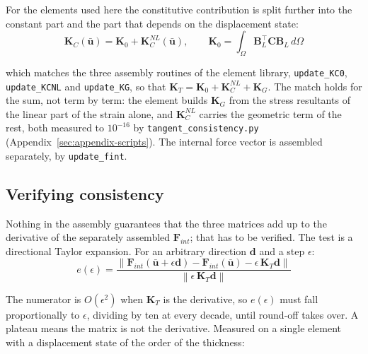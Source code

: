 \documentclass[11pt,a4paper]{article}
\begin{document}
For the elements used here the constitutive contribution is split further into
the constant part and the part that depends on the displacement state:
\begin{equation}\label{eq:KC-split}
	\boldsymbol{K}_C(\boldsymbol{\bar{u}})
	= \boldsymbol{K}_0 + \boldsymbol{K}_C^{NL}(\boldsymbol{\bar{u}}),
	\qquad
	\boldsymbol{K}_0 = \int_{\Omega} \boldsymbol{B}_L^\top \boldsymbol{C}
	                   \boldsymbol{B}_L \, d\Omega
\end{equation}

\noindent which matches the three assembly routines of the element library,
\texttt{update\_KC0}, \texttt{update\_KCNL} and \texttt{update\_KG}, so that
$\boldsymbol{K}_T = \boldsymbol{K}_0 + \boldsymbol{K}_C^{NL} +
\boldsymbol{K}_G$.  The match holds for the sum, not term by term:
the element builds $\boldsymbol{K}_G$ from the stress resultants of the linear
part of the strain alone, and $\boldsymbol{K}_C^{NL}$ carries the geometric
term of the rest, both measured to $10^{-16}$ by
\texttt{tangent\_consistency.py} (Appendix~\ref{sec:appendix-scripts}).  The
internal force vector is assembled separately, by \texttt{update\_fint}.

\subsection{Verifying consistency}
\label{sec:tangent-check}

Nothing in the assembly guarantees that the three matrices add up to the
derivative of the separately assembled $\boldsymbol{F}_{int}$; that has to be
verified.  The test is a directional Taylor expansion.  For an arbitrary
direction $\boldsymbol{d}$ and a step $\epsilon$:
\begin{equation}\label{eq:taylor-test}
	e(\epsilon) = \frac{\left\lVert \boldsymbol{F}_{int}
	  (\boldsymbol{\bar{u}} + \epsilon\boldsymbol{d})
	  - \boldsymbol{F}_{int}(\boldsymbol{\bar{u}})
	  - \epsilon\,\boldsymbol{K}_T\boldsymbol{d} \right\rVert}
	  {\left\lVert \epsilon\,\boldsymbol{K}_T\boldsymbol{d} \right\rVert}
\end{equation}

The numerator is $O(\epsilon^2)$ when $\boldsymbol{K}_T$ is the derivative, so
$e(\epsilon)$ must fall proportionally to $\epsilon$, dividing by ten at every
decade, until round-off takes over.  A plateau means the matrix is not the
derivative.  Measured on a single element with a displacement state of the
order of the thickness:
\end{document}
